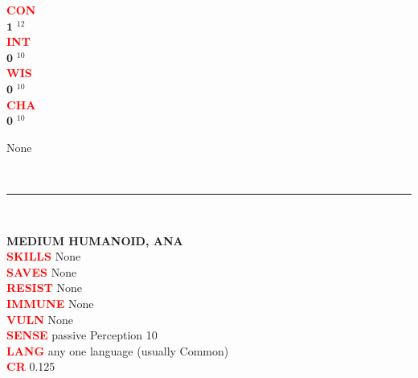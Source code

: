 \documentclass{article}
\begin{document}
\begin{adjustbox}{minipage=0.45\textwidth, margin=\fboxsep, bgimage=../images/texture2.pdf}
{\begin{minipage}[t][10.5in][t]{0.9\textwidth}
\begin{minipage}[t]{0.2\textwidth}
{            \textcolor{red}{\textbf{CON}}\\[0.1em]
            $\mathbf{1}$\,\,$^{12}$ \\[0.1em]
            \textcolor{red}{\textbf{INT}}\\[0.1em]
            $\mathbf{0}$\,\,$^{10}$ \\[0.1em]
            \textcolor{red}{\textbf{WIS}}\\[0.1em]
            $\mathbf{0}$\,\,$^{10}$ \\[0.1em]
            \textcolor{red}{\textbf{CHA}}\\[0.1em]
            $\mathbf{0}$\,\,$^{10}$ \\[0.1em]
            }
        \end{minipage}
        \hspace{-0.1in}
        \vline
        \hspace{0.1in}
        \begin{minipage}[t]{0.7\textwidth}
            None
        \end{minipage}
        \vspace{0.025in}\\
        \rule{\textwidth}{1pt}\\
        \vspace{-0.08in}
        \begin{flushleft}
            {\large\textbf{MEDIUM HUMANOID, ANA}}\\
            \textcolor{red}{\textbf{SKILLS}} None \\
            \textcolor{red}{\textbf{SAVES}} None \\
            \textcolor{red}{\textbf{RESIST}} None\\
            \textcolor{red}{\textbf{IMMUNE}} None\\
            \textcolor{red}{\textbf{VULN}} None\\      
            \textcolor{red}{\textbf{SENSE}} passive Perception 10\\
            \textcolor{red}{\textbf{LANG}} any one language (usually Common)\\
            \textcolor{red}{\textbf{CR}}  0.125\\
        \end{flushleft}
        \end{minipage}
    }
\end{adjustbox}                  
\end{document}
